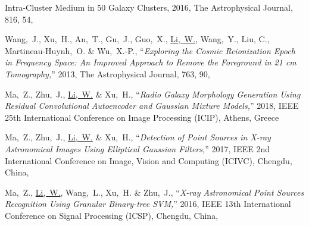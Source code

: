 \begin{publications}{99}
{      Intra-Cluster Medium in 50 Galaxy Clusters,}
    2016, The Astrophysical Journal, 816, 54,
  \item Wang,~J., Xu,~H., An,~T., Gu,~J., Guo,~X., \ul{Li,~W.},
    Wang,~Y., Liu, C., Martineau-Huynh,~O. \& Wu,~X.-P.,
    \enquote{\it Exploring the Cosmic Reionization Epoch in Frequency
      Space: An Improved Approach to Remove the Foreground in 21 cm
      Tomography,}
    2013, The Astrophysical Journal, 763, 90,
  \item Ma,~Z., Zhu,~J., \ul{Li,~W.} \& Xu,~H.,
    \enquote{\it Radio Galaxy Morphology Generation Using Residual
      Convolutional Autoencoder and Gaussian Mixture Models,}
    2018, IEEE 25th International Conference on Image Processing (ICIP),
    Athens, Greece
  \item Ma,~Z., Zhu,~J., \ul{Li,~W.} \& Xu,~H.,
    \enquote{\it Detection of Point Sources in X-ray Astronomical Images
      Using Elliptical Gaussian Filters,}
    2017, IEEE 2nd International Conference on Image, Vision and Computing (ICIVC),
    Chengdu, China,
  \item Ma,~Z., \ul{Li,~W.}, Wang,~L., Xu,~H. \& Zhu,~J.,
    \enquote{\it X-ray Astronomical Point Sources Recognition Using
      Granular Binary-tree SVM,}
    2016, IEEE 13th International Conference on Signal Processing (ICSP),
    Chengdu, China,
\end{publications}

